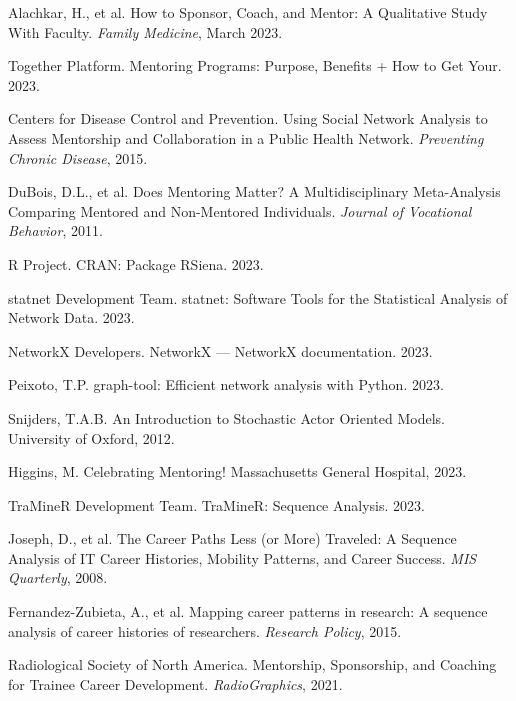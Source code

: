 \documentclass[main.tex]{subfiles}
\begin{document}
\begin{thebibliography}{99}

Alachkar, H., et al. How to Sponsor, Coach, and Mentor: A Qualitative Study With Faculty. \textit{Family Medicine}, March 2023.

Together Platform. Mentoring Programs: Purpose, Benefits + How to Get Your. 2023.

Centers for Disease Control and Prevention. Using Social Network Analysis to Assess Mentorship and Collaboration in a Public Health Network. \textit{Preventing Chronic Disease}, 2015.

DuBois, D.L., et al. Does Mentoring Matter? A Multidisciplinary Meta-Analysis Comparing Mentored and Non-Mentored Individuals. \textit{Journal of Vocational Behavior}, 2011.

R Project. CRAN: Package RSiena. 2023.

statnet Development Team. statnet: Software Tools for the Statistical Analysis of Network Data. 2023.

NetworkX Developers. NetworkX — NetworkX documentation. 2023.

Peixoto, T.P. graph-tool: Efficient network analysis with Python. 2023.

Snijders, T.A.B. An Introduction to Stochastic Actor Oriented Models. University of Oxford, 2012.

Higgins, M. Celebrating Mentoring! Massachusetts General Hospital, 2023.

TraMineR Development Team. TraMineR: Sequence Analysis. 2023.

Joseph, D., et al. The Career Paths Less (or More) Traveled: A Sequence Analysis of IT Career Histories, Mobility Patterns, and Career Success. \textit{MIS Quarterly}, 2008.

Fernandez-Zubieta, A., et al. Mapping career patterns in research: A sequence analysis of career histories of researchers. \textit{Research Policy}, 2015.

Radiological Society of North America. Mentorship, Sponsorship, and Coaching for Trainee Career Development. \textit{RadioGraphics}, 2021.

\end{thebibliography}
\end{document}
